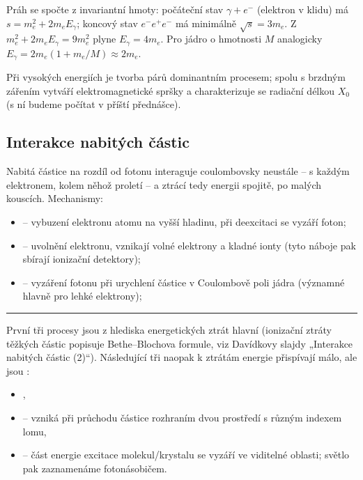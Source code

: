 \begin{vysvetleni}
Práh se spočte z invariantní hmoty: počáteční stav \(\gamma + e^-\) (elektron
v klidu) má \(s = m_e^2 + 2m_eE_\gamma\); koncový stav \(e^-e^+e^-\) má
minimálně \(\sqrt s = 3m_e\). Z \(m_e^2 + 2m_eE_\gamma = 9m_e^2\) plyne
\(E_\gamma = 4m_e\). Pro jádro o hmotnosti \(M\) analogicky
\(E_\gamma = 2m_e(1 + m_e/M) \approx 2m_e\).
\end{vysvetleni}

Při vysokých energiích je tvorba párů dominantním procesem; spolu
s brzdným zářením vytváří elektromagnetické spršky a charakterizuje se
radiační délkou \(X_0\) (s ní budeme počítat v příští přednášce).

\subsection{Interakce nabitých částic}

Nabitá částice na rozdíl od fotonu interaguje coulombovsky neustále
– s každým elektronem, kolem něhož proletí – a ztrácí tedy energii
spojitě, po malých kouscích. Mechanismy:
\begin{itemize}
  \item {} – vybuzení elektronu atomu na vyšší hladinu, při
  deexcitaci se vyzáří foton;
  \item {} – uvolnění elektronu, vznikají volné elektrony
  a kladné ionty (tyto náboje pak sbírají ionizační detektory);
  \item {} – vyzáření fotonu při urychlení částice
  v Coulombově poli jádra (významné hlavně pro lehké elektrony);
\end{itemize}
\vspace{-4pt}\noindent\rule{3cm}{0.4pt}

První tři procesy jsou z hlediska energetických ztrát hlavní (ionizační
ztráty těžkých částic popisuje Bethe–Blochova formule, viz Davídkovy slajdy
„Interakce nabitých částic (2)``). Následující tři naopak k ztrátám
energie přispívají málo, ale jsou :
\begin{itemize}
  \item {},
  \item {} – vzniká při průchodu částice rozhraním dvou
  prostředí s různým indexem lomu,
  \item {} – část energie excitace molekul/krystalu se vyzáří
  ve viditelné oblasti; světlo pak zaznamenáme fotonásobičem.
\end{itemize}

